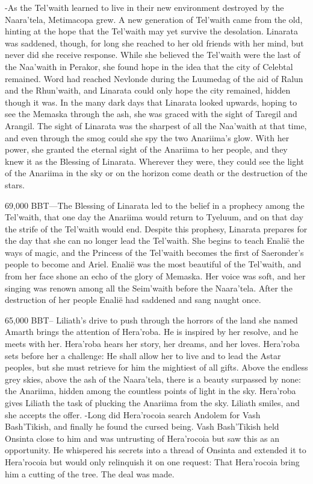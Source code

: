 \documentclass[smalldemyvopaper,11pt,twoside,onecolumn,openright,extrafontsizes]{memoir}
\begin{document}
{{-As the Tel’waith learned to live in their new environment destroyed by the Naara’tela, Metimacopa grew. A new generation of Tel’waith came from the old, hinting at the hope that the Tel’waith may yet survive the desolation. Linarata was saddened, though, for long she reached to her old friends with her mind, but never did she receive response. While she believed the Tel’waith were the last of the Naa’waith in Perakor, she found hope in the idea that the city of Celebtal remained. Word had reached Nevlonde during the Luumedag of the aid of Ralun and the Rhun’waith, and Linarata could only hope the city remained, hidden though it was. In the many dark days that Linarata looked upwards, hoping to see the Memaska through the ash, she was graced with the sight of Taregil and Arangil. The sight of Linarata was the sharpest of all the Naa’waith at that time, and even through the smog could she spy the two Anariima’s glow. With her power, she granted the eternal sight of the Anariima to her people, and they knew it as the Blessing of Linarata. Wherever they were, they could see the light of the Anariima in the sky or on the horizon come death or the destruction of the stars.

69,000 BBT—The Blessing of Linarata led to the belief in a prophecy among the Tel’waith, that one day the Anariima would return to Tyeluum, and on that day the strife of the Tel’waith would end. Despite this prophesy, Linarata prepares for the day that she can no longer lead the Tel’waith. She begins to teach Enalië the ways of magic, and the Princess of the Tel’waith becomes the first of Saeronder’s people to become and Ariel. Enalië was the most beautiful of the Tel’waith, and from her face shone an echo of the glory of Memaska. Her voice was soft, and her singing was renown among all the Seim’waith before the Naara’tela. After the destruction of her people Enalië had saddened and sang naught once.

65,000 BBT-- Liliath’s drive to push through the horrors of the land she named Amarth brings the attention of Hera’roba. He is inspired by her resolve, and he meets with her. Hera’roba hears her story, her dreams, and her loves. Hera’roba sets before her a challenge: He shall allow her to live and to lead the Astar peoples, but she must retrieve for him the mightiest of all gifts. Above the endless grey skies, above the ash of the Naara’tela, there is a beauty surpassed by none: the Anariima, hidden among the countless points of light in the sky. Hera’roba gives Liliath the task of plucking the Anariima from the sky. Liliath smiles, and she accepts the offer.
-Long did Hera’rocoia search Andolem for Vash Bash’Tikish, and finally he found the cursed being. Vash Bash’Tikish held Onsinta close to him and was untrusting of Hera’rocoia but saw this as an opportunity. He whispered his secrets into a thread of Onsinta and extended it to Hera’rocoia but would only relinquish it on one request: That Hera’rocoia bring him a cutting of the tree. The deal was made.

}}
\end{document}
